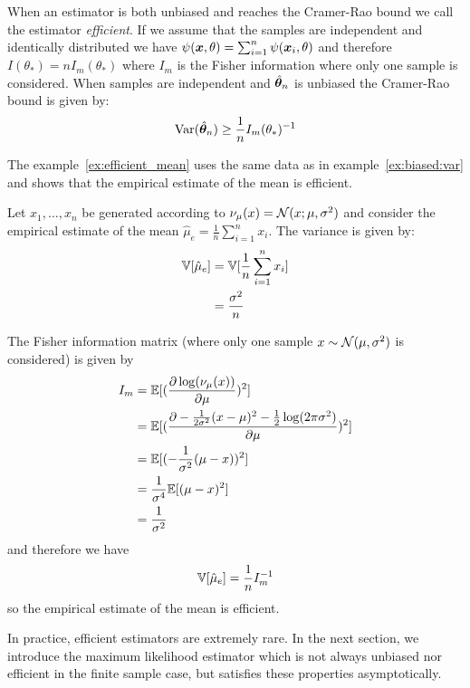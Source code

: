 When an estimator is both unbiased and reaches the Cramer-Rao bound we call the
estimator \emph{efficient}.
If we assume that the samples are independent and identically distributed we
have $\psi(\boldsymbol{x}, \theta) = \sum_{i=1}^n \psi(\boldsymbol{x}_i, \theta)$ and therefore
$I(\theta_*) = nI_m(\theta_*)$ where $I_m$ is the Fisher information where only
one sample is considered.
When samples are independent and $\hat{\boldsymbol{\theta}}_n$ is unbiased the Cramer-Rao
bound is given by:
\begin{equation}
  \operatorname*{Var}(\hat{\boldsymbol{\theta}}_n) \geq \frac1{n} I_m(\theta_*)^{-1}
\end{equation}

The example~\ref{ex:efficient_mean} uses the same data as in
example~\ref{ex:biased:var} and shows that the empirical estimate of the mean
is efficient.
\begin{example}
  \label{ex:efficient_mean}
  Let $x_1, \dots, x_n$ be generated according to $\nu_{\mu}(x) = \mathcal{N}(x; \mu, \sigma^2)$ and
  consider the empirical estimate of the mean $\hat{\mu}_e = \frac1{n}
  \sum_{i=1}^n x_i$.
  The variance is given by:
  \begin{align}
    \mathbb{V}[\hat{\mu}_e] &= \mathbb{V}[\frac1{n} \sum_{i=1}^n x_i] \\
    &= \frac{\sigma^2}{n}
  \end{align}

  The Fisher information matrix (where only one sample $x \sim \mathcal{N}(\mu, \sigma^2)$ is considered) is given by
  \begin{align}
    I_m &= \mathbb{E}[(\frac{ \partial \log(\nu_{\mu}(x))}{\partial \mu})^2] \\
      &= \mathbb{E}[(\frac{ \partial -\frac1{2 \sigma^2} (x - \mu)^2 - \frac12\log(2\pi \sigma^2)}{\partial \mu})^2] \\
      &= \mathbb{E}[(-\frac1{\sigma^2} (\mu - x))^2] \\
      &= \frac1{\sigma^4}\mathbb{E} [(\mu - x)^2] \\
      &= \frac1{\sigma^2}
  \end{align}
  and therefore we have
  \begin{equation}
  \mathbb{V}[\hat{\mu}_e]  = \frac1{n} I_m^{-1}
  \end{equation}
  so the empirical estimate of the mean is efficient.
\end{example}
In practice, efficient estimators are extremely rare. In the next section, we
introduce the maximum likelihood estimator which is not always unbiased nor
efficient in the finite sample case, but satisfies these properties asymptotically.

